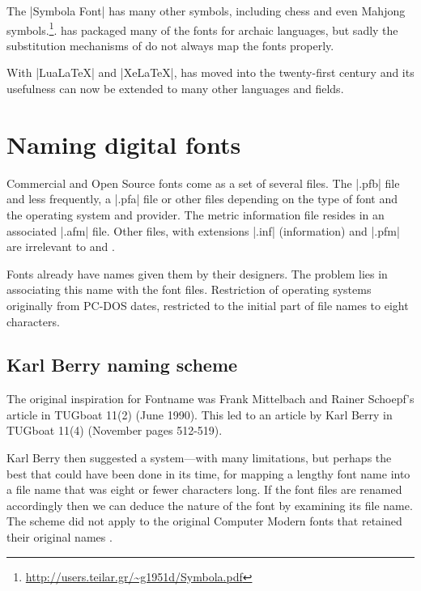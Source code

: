 %

The |Symbola Font| has many other symbols, including chess and even Mahjong symbols.\footnote{\url{http://users.teilar.gr/~g1951d/Symbola.pdf}}.  has packaged many of the fonts for archaic languages, but sadly the substitution mechanisms of \latexe do not always map the fonts properly.

With |LuaLaTeX| and |XeLaTeX|, \tex has moved into the twenty-first century and its usefulness can now be extended to many other languages and fields. 


\section{Naming digital fonts}

Commercial and Open Source fonts come as a set of several files. The |.pfb| file and less frequently, a |.pfa| file or other files depending on the type of font and the operating system and provider. The metric information file resides in an associated |.afm| file. Other files, with extensions |.inf| (information) and |.pfm| are irrelevant to \latex and \tex.

Fonts already have names given them by their designers. The problem lies in associating this name with the font files. Restriction of operating systems originally from PC-DOS dates, restricted to the initial part of file names to eight characters.

\subsection{Karl Berry naming scheme}

The original inspiration for Fontname was Frank Mittelbach and Rainer Schoepf's article in TUGboat 11(2) (June 1990). This led to an article by Karl Berry in TUGboat 11(4) (November pages 512-519).

Karl Berry then suggested a system---with many limitations, but perhaps the best that could have been done in its time, for mapping a lengthy font name into a file name that was eight or fewer characters long. If the font files are renamed accordingly then we can deduce the nature of the font by examining its file name. The scheme did not apply to the original Computer Modern fonts that retained their original names \citep{fontname}.

